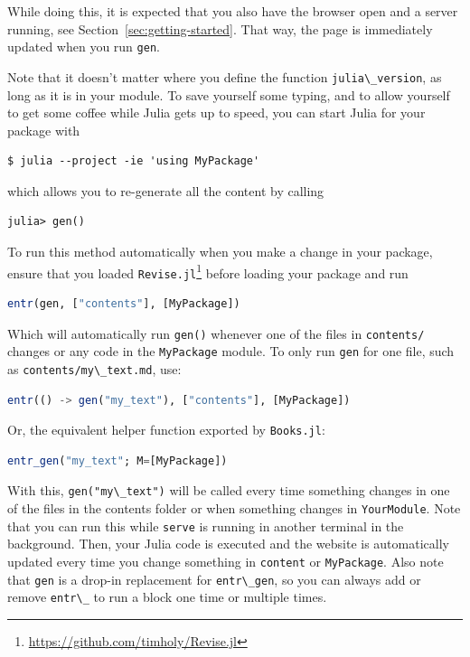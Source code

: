 \documentclass[
  notoc %
]{tufte-book}
\DeclareRobustCommand{\href}[2]{#2\footnote{\url{#1}}}
\newcommand{\passthrough}[1]{#1}
\begin{document}
While doing this, it is expected that you also have the browser open and
a server running, see Section~\ref{sec:getting-started}. That way, the
page is immediately updated when you run \passthrough{\lstinline!gen!}.

Note that it doesn't matter where you define the function
\passthrough{\lstinline!julia\_version!}, as long as it is in your
module. To save yourself some typing, and to allow yourself to get some
coffee while Julia gets up to speed, you can start Julia for your
package with

\begin{lstlisting}
$ julia --project -ie 'using MyPackage'
\end{lstlisting}

which allows you to re-generate all the content by calling

\begin{lstlisting}
julia> gen()
\end{lstlisting}

To run this method automatically when you make a change in your package,
ensure that you loaded
\href{https://github.com/timholy/Revise.jl}{\passthrough{\lstinline!Revise.jl!}}
before loading your package and run

\begin{lstlisting}[language=Julia]
entr(gen, ["contents"], [MyPackage])
\end{lstlisting}

Which will automatically run \passthrough{\lstinline!gen()!} whenever
one of the files in \passthrough{\lstinline!contents/!} changes or any
code in the \passthrough{\lstinline!MyPackage!} module. To only run
\passthrough{\lstinline!gen!} for one file, such as
\passthrough{\lstinline!contents/my\_text.md!}, use:

\begin{lstlisting}[language=Julia]
entr(() -> gen("my_text"), ["contents"], [MyPackage])
\end{lstlisting}

Or, the equivalent helper function exported by
\passthrough{\lstinline!Books.jl!}:

\begin{lstlisting}[language=Julia]
entr_gen("my_text"; M=[MyPackage])
\end{lstlisting}

With this, \passthrough{\lstinline!gen("my\_text")!} will be called
every time something changes in one of the files in the contents folder
or when something changes in \passthrough{\lstinline!YourModule!}. Note
that you can run this while \passthrough{\lstinline!serve!} is running
in another terminal in the background. Then, your Julia code is executed
and the website is automatically updated every time you change something
in \passthrough{\lstinline!content!} or
\passthrough{\lstinline!MyPackage!}. Also note that
\passthrough{\lstinline!gen!} is a drop-in replacement for
\passthrough{\lstinline!entr\_gen!}, so you can always add or remove
\passthrough{\lstinline!entr\_!} to run a block one time or multiple
times.
\end{document}
